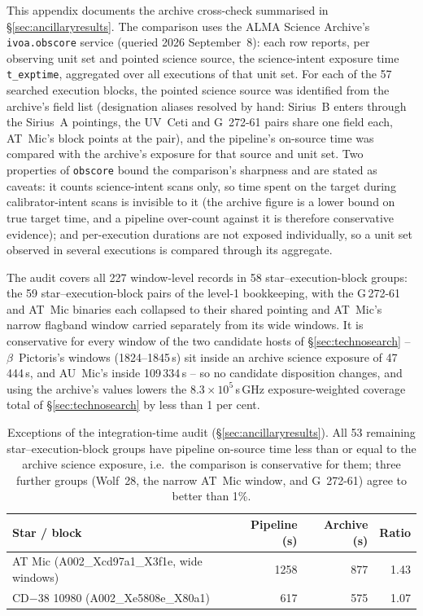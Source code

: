 \documentclass{openjournal}
\begin{document}
This appendix documents the archive cross-check summarised in
\S\ref{sec:ancillaryresults}. The comparison uses the ALMA Science Archive's
\texttt{ivoa.obscore} service (queried 2026 September~8): each row
reports, per observing unit set and pointed science source, the
science-intent exposure time \texttt{t\_exptime}, aggregated over all
executions of that unit set. For each of the 57 searched execution
blocks, the pointed science source was identified from the archive's
field list (designation aliases resolved by hand: Sirius~B enters
through the Sirius~A pointings, the UV~Ceti and G~272-61 pairs share
one field each, AT~Mic's block points at the pair), and the pipeline's
on-source time was compared with the archive's exposure for that
source and unit set. Two properties of \texttt{obscore} bound the
comparison's sharpness and are stated as caveats: it counts
science-intent scans only, so time spent on the target during
calibrator-intent scans is invisible to it (the archive figure is a
lower bound on true target time, and a pipeline over-count against it
is therefore conservative evidence); and per-execution durations are
not exposed individually, so a unit set observed in several executions
is compared through its aggregate.

The audit covers all 227 window-level records in 58
star--execution-block groups: the 59 star--execution-block pairs of the
level-1 bookkeeping, with the G\,272-61 and AT~Mic binaries each
collapsed to their shared pointing and AT~Mic's narrow flagband window
carried separately from its wide windows. It is conservative for every
window of the two candidate hosts of \S\ref{sec:technosearch} --
$\beta$~Pictoris's windows (1824--1845\,s) sit inside an archive
science exposure of 47\,444\,s, and AU~Mic's inside 109\,334\,s -- so
no candidate disposition changes, and using the archive's values
lowers the $8.3\times10^{5}$\,s\,GHz exposure-weighted coverage total
of \S\ref{sec:technosearch} by less than 1 per cent.

\begin{table}
\centering
\small
\caption{Exceptions of the integration-time audit
(\S\ref{sec:ancillaryresults}). All 53 remaining star--execution-block
groups have pipeline on-source time less than or equal to the archive
science exposure, i.e.\ the comparison is conservative for them;
three further groups (Wolf~28, the narrow AT~Mic window, and
G~272-61) agree to better than 1\%.}
\label{tab:audit}
\begin{tabular}{@{}lrrr@{}}
\hline
Star / block & Pipeline (s) & Archive (s) & Ratio \\
\hline
AT Mic (A002\_Xcd97a1\_X3f1e, wide windows) & 1258 & 877 & 1.43 \\
CD$-$38 10980 (A002\_Xe5808e\_X80a1) & 617 & 575 & 1.07 \\
\hline
\end{tabular}
\end{table}
\end{document}
